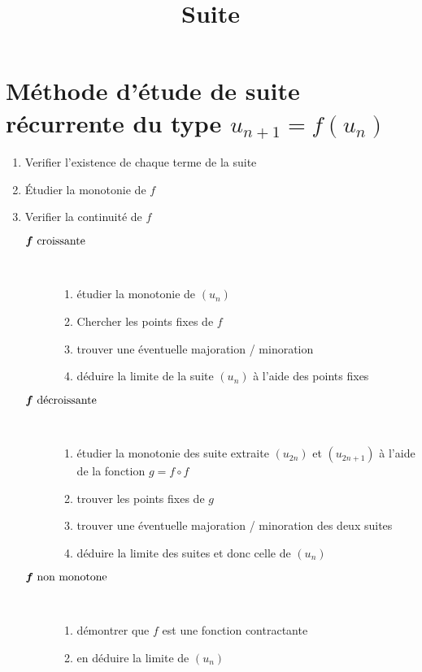 

\title{Suite}



\section{Méthode d'étude de suite récurrente du type $u_{n + 1} = f(u_n)$}
\begin{enumerate}
    \item Verifier l'existence de chaque terme de la suite
    \item \'Etudier la monotonie de $f$
    \item Verifier la continuité de $f$
    \begin{description}
        \item[$\bs{f \cro}$] \quad \\
        \begin{enumerate}
            \item étudier la monotonie de $(u_n)$
            \item Chercher les points fixes de $f$
            \item trouver une éventuelle majoration / minoration
            \item déduire la limite de la suite $(u_n)$ à l'aide des points
            fixes
        \end{enumerate}
        \item[$\bs{f \dec}$] \quad \\
        \begin{enumerate}
            \item étudier la monotonie des suite extraite $(u_{2n})$ et
            $(u_{2n + 1})$ à l'aide de la fonction $g = f\circ f$
            \item trouver les points fixes de $g$
            \item trouver une éventuelle majoration / minoration des deux
            suites
            \item déduire la limite des suites et donc celle de $(u_n)$
        \end{enumerate}
        \item[$\bs{f \text{ non monotone}}$] \quad \\
        \begin{enumerate}
            \item démontrer que $f$ est une fonction contractante
            \item en déduire la limite de $(u_n)$
        \end{enumerate}
    \end{description}
\end{enumerate}



